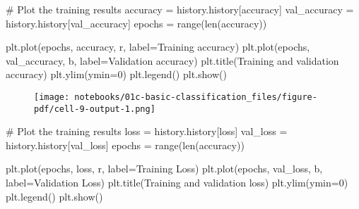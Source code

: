 \documentclass[
  letterpaper,
  DIV=11,
  numbers=noendperiod]{scrreprt}
\newenvironment{Shaded}{\begin{snugshade}}{\end{snugshade}}
\newcommand{\BuiltInTok}[1]{\textcolor[rgb]{0.00,0.23,0.31}{#1}}
\newcommand{\CommentTok}[1]{\textcolor[rgb]{0.37,0.37,0.37}{#1}}
\newcommand{\DecValTok}[1]{\textcolor[rgb]{0.68,0.00,0.00}{#1}}
\newcommand{\NormalTok}[1]{\textcolor[rgb]{0.00,0.23,0.31}{#1}}
\newcommand{\OperatorTok}[1]{\textcolor[rgb]{0.37,0.37,0.37}{#1}}
\newcommand{\StringTok}[1]{\textcolor[rgb]{0.13,0.47,0.30}{#1}}
\begin{document}
\begin{Shaded}
\begin{Highlighting}[]
\CommentTok{\# Plot the training results}
\NormalTok{accuracy     }\OperatorTok{=}\NormalTok{ history.history[}\StringTok{\textquotesingle{}accuracy\textquotesingle{}}\NormalTok{]}
\NormalTok{val\_accuracy }\OperatorTok{=}\NormalTok{ history.history[}\StringTok{\textquotesingle{}val\_accuracy\textquotesingle{}}\NormalTok{]}
\NormalTok{epochs       }\OperatorTok{=} \BuiltInTok{range}\NormalTok{(}\BuiltInTok{len}\NormalTok{(accuracy))}

\NormalTok{plt.plot(epochs, accuracy, }\StringTok{\textquotesingle{}r\textquotesingle{}}\NormalTok{, label}\OperatorTok{=}\StringTok{\textquotesingle{}Training accuracy\textquotesingle{}}\NormalTok{)}
\NormalTok{plt.plot(epochs, val\_accuracy, }\StringTok{\textquotesingle{}b\textquotesingle{}}\NormalTok{, label}\OperatorTok{=}\StringTok{\textquotesingle{}Validation accuracy\textquotesingle{}}\NormalTok{)}
\NormalTok{plt.title(}\StringTok{\textquotesingle{}Training and validation accuracy\textquotesingle{}}\NormalTok{)}
\NormalTok{plt.ylim(ymin}\OperatorTok{=}\DecValTok{0}\NormalTok{)}
\NormalTok{plt.legend()}
\NormalTok{plt.show()}
\end{Highlighting}
\end{Shaded}

\begin{figure}[H]

{\centering \texttt{[image: notebooks/01c-basic-classification\_files/figure-pdf/cell-9-output-1.png]}

}

\end{figure}

\begin{Shaded}
\begin{Highlighting}[]
\CommentTok{\# Plot the training results}
\NormalTok{loss     }\OperatorTok{=}\NormalTok{ history.history[}\StringTok{\textquotesingle{}loss\textquotesingle{}}\NormalTok{]}
\NormalTok{val\_loss }\OperatorTok{=}\NormalTok{ history.history[}\StringTok{\textquotesingle{}val\_loss\textquotesingle{}}\NormalTok{]}
\NormalTok{epochs   }\OperatorTok{=} \BuiltInTok{range}\NormalTok{(}\BuiltInTok{len}\NormalTok{(accuracy))}

\NormalTok{plt.plot(epochs, loss, }\StringTok{\textquotesingle{}r\textquotesingle{}}\NormalTok{, label}\OperatorTok{=}\StringTok{\textquotesingle{}Training Loss\textquotesingle{}}\NormalTok{)}
\NormalTok{plt.plot(epochs, val\_loss, }\StringTok{\textquotesingle{}b\textquotesingle{}}\NormalTok{, label}\OperatorTok{=}\StringTok{\textquotesingle{}Validation Loss\textquotesingle{}}\NormalTok{)}
\NormalTok{plt.title(}\StringTok{\textquotesingle{}Training and validation loss\textquotesingle{}}\NormalTok{)}
\NormalTok{plt.ylim(ymin}\OperatorTok{=}\DecValTok{0}\NormalTok{)}
\NormalTok{plt.legend()}
\NormalTok{plt.show()}
\end{Highlighting}
\end{Shaded}
\end{document}
